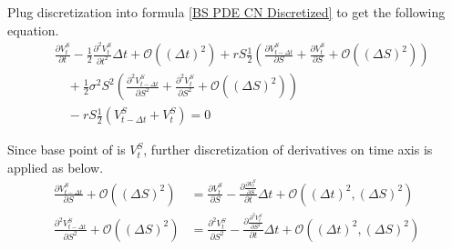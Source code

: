 \documentclass{article}
\begin{document}
Plug discretization into formula \ref{BS PDE CN Discretized} to get the following equation.
\begin{align}
    & \frac{\partial V_{t}^{S}}{\partial t} - \frac{1}{2} \frac{\partial^2 V_{t}^{S}}{\partial t^2} \Delta t + \mathcal{O}\left(\left(\Delta t\right)^2\right) + r S \frac{1}{2} \left(\frac{\partial V_{t - \Delta t}^{S}}{\partial S} + \frac{\partial V_{t}^{S}}{\partial S} + \mathcal{O}\left(\left(\Delta S\right)^2\right)\right) \nonumber \\
    & \quad + \frac{1}{2} \sigma^2 S^2 \left(\frac{\partial^2 V_{t - \Delta t}^{S}}{\partial S^2} + \frac{\partial^2 V_{t}^{S}}{\partial S^2} + \mathcal{O}\left(\left(\Delta S\right)^2\right)\right) \nonumber \\
    & \quad - r S \frac{1}{2} \left(V_{t - \Delta t}^{S} + V_{t}^{S}\right) = 0 \label{BS PDE CN reverted}
\end{align}

Since base point of is $ V_{t}^{S} $, further discretization of derivatives on time axis is applied as below.
\begin{align}
    \frac{\partial V_{t - \Delta t}^{S}}{\partial S} + \mathcal{O}\left(\left(\Delta S\right)^2\right) &= \frac{\partial V_{t}^{S}}{\partial S} - \frac{\partial \frac{\partial V_{t}^{S}}{\partial S}}{\partial t} \Delta t + \mathcal{O}\left(\left(\Delta t\right)^2, \left(\Delta S\right)^2\right) \\
    \frac{\partial^2 V_{t - \Delta t}^{S}}{\partial S^2} + \mathcal{O}\left(\left(\Delta S\right)^2\right) &= \frac{\partial^2 V_{t}^{S}}{\partial S^2} - \frac{\partial \frac{\partial^2 V_{t}^{S}}{\partial S^2}}{\partial t} \Delta t + \mathcal{O}\left(\left(\Delta t\right)^2, \left(\Delta S\right)^2\right)
\end{align}
\end{document}
